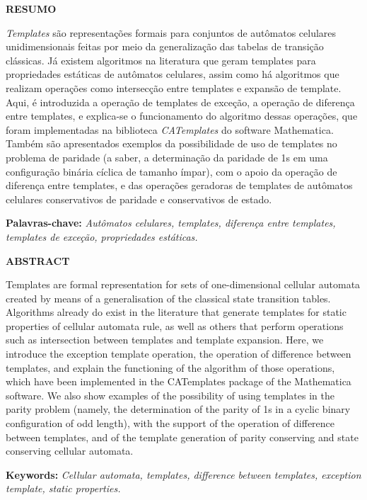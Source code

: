 \newpage
\thispagestyle{plain}
\begin{center}
\large
\textbf{RESUMO}
\end{center}
\textit{Templates} são representações formais para conjuntos de autômatos celulares unidimensionais feitas por meio da generalização das tabelas de transição clássicas. Já existem algoritmos na literatura que geram templates para propriedades estáticas de autômatos celulares, assim como há algoritmos que realizam operações como intersecção entre templates e expansão de template. Aqui, é introduzida a operação de templates de exceção, a operação de diferença entre templates, e explica-se o funcionamento do algoritmo dessas operações, que foram implementadas na biblioteca \textit{CATemplates} do software Mathematica. Também são apresentados exemplos da possibilidade de uso de templates no problema de paridade (a saber, a determinação da paridade de 1s em uma configuração binária cíclica de tamanho ímpar), com o apoio da operação de diferença entre templates, e das operações geradoras de templates de autômatos celulares conservativos de paridade e conservativos de estado.
\\[0.5cm]																																																																																																																																																																																																																																																			
\begin{flushleft}
{\bf Palavras-chave:} {\it Autômatos celulares, templates, diferença entre templates, templates de exceção, propriedades estáticas.}
\end{flushleft}


\newpage
\thispagestyle{plain}
\begin{center}
\large  
\textbf{ABSTRACT}
\end{center}
Templates are formal representation for sets of one-dimensional cellular automata created by means of a generalisation of the classical state transition tables. Algorithms already do exist in the literature that generate templates for static properties of cellular automata rule, as well as others that perform operations such as intersection between templates and template expansion. Here, we introduce the exception template operation, the operation of difference between templates, and explain the functioning of the algorithm of those operations, which have been implemented in the CATemplates package of the Mathematica software. We also show examples of the possibility of using templates in the parity problem (namely, the determination of the parity of 1s in a cyclic binary configuration of odd length), with the support of the operation of difference between templates, and of the template generation of parity conserving and state conserving cellular automata.
\\[0.5cm]
\begin{flushleft}
{\bf Keywords:} {\it Cellular automata, templates, difference between templates, exception template, static properties.}
\end{flushleft}